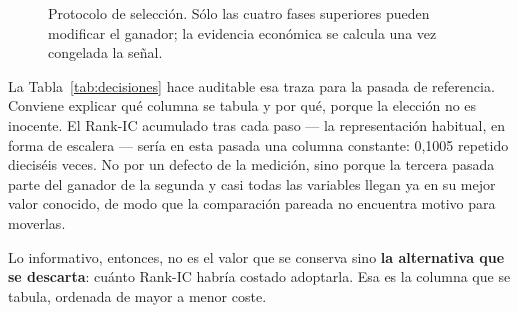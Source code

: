 \begin{figure}[H]
  \centering
  \caption{Protocolo de selección. Sólo las cuatro fases superiores pueden modificar el ganador;
  la evidencia económica se calcula una vez congelada la señal.}
  \label{fig:protocolo}
\end{figure}

La Tabla~\ref{tab:decisiones} hace auditable esa traza para la pasada de referencia. Conviene
explicar qué columna se tabula y por qué, porque la elección no es inocente. El Rank-IC acumulado
tras cada paso --- la representación habitual, en forma de escalera --- sería en esta pasada una
columna constante: 0,1005 repetido dieciséis veces. No por un defecto de la medición, sino porque la
tercera pasada parte del ganador de la segunda y casi todas las variables llegan ya en su mejor
valor conocido, de modo que la comparación pareada no encuentra motivo para moverlas.

Lo informativo, entonces, no es el valor que se conserva sino \textbf{la alternativa que se
descarta}: cuánto Rank-IC habría costado adoptarla. Esa es la columna que se tabula, ordenada de
mayor a menor coste.

\begin{table}[H]
  \centering
  \small
  \caption{Qué alternativa se rechazó en cada decisión y cuánto habría costado adoptarla.}
  \label{tab:decisiones}
  
  \caption*{Fuente: . El coste es el Rank-IC de la mejor alternativa menos
  el del ganador; un coste \emph{positivo} indica que la alternativa medía mejor y que el ganador se
  decidió por otra vía, lo que sólo ocurre en los empates técnicos.}
\end{table}

